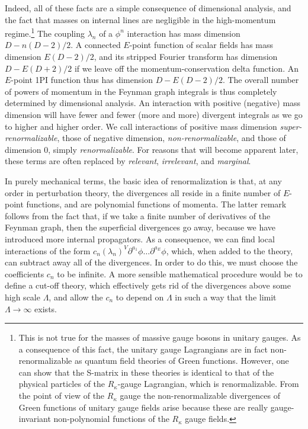 Indeed, all of these facts are a simple consequence of dimensional analysis,
and the fact that masses on internal lines are negligible in the high-momentum
regime.\footnote[1]{This is not true for the masses of massive gauge bosons in
unitary gauges. As a consequence of this fact, the unitary gauge Lagrangians
are in fact non-renormalizable as quantum field theories of Green functions.
However, one can show that the S-matrix in these theories is identical to that
of the physical particles of the $R_\kappa$-gauge Lagrangian, which is
renormalizable. From the point of view of the $R_\kappa$ gauge the
non-renormalizable divergences of Green functions of unitary gauge fields
arise because these are really gauge-invariant non-polynomial functions of the
$R_\kappa$ gauge fields.}
The coupling $\lambda_n$ of a $\phi^n$ interaction has mass dimension
$D-n(D-2)/2$. A connected $E$-point function of scalar fields has mass
dimension $E(D-2)/2$, and its stripped Fourier transform has dimension
$D-E(D+2)/2$ if we leave off the momentum-conservation delta function. An
$E$-point 1PI function thus has dimension $D-E(D-2)/2$. The overall number of powers of momentum in the Feynman
graph integrals is thus completely determined by dimensional analysis. An
interaction with positive (negative) mass dimension will have fewer and fewer
(more and more) divergent integrals as we go to higher and higher order. We
call interactions of positive mass dimension \emph{super-renormalizable},
those of negative dimension, \emph{non-renormalizable}, and those of dimension
0, simply \emph{renormalizable}. For reasons that will become apparent later,
these terms are often replaced by \emph{relevant}, \emph{irrelevant}, and
\emph{marginal}.

In purely mechanical terms, the basic idea of renormalization is that, at any
order in perturbation theory, the divergences all reside in a finite number of
$E$-point functions, and are polynomial functions of momenta. The latter
remark follows from the fact that, if we take a finite number of derivatives of
the Feynman graph, then the superficial divergences go away, because we have
introduced more internal propagators. As a consequence, we can find local
interactions of the form
$c_n(\lambda_n)^V\partial^{a_1}\phi\ldots\partial^{a_E}\phi$, which,
when added to the theory, can subtract away all of the divergences. In order
to do this, we must choose the coefficients $c_n$ to be infinite. A more
sensible mathematical procedure would be to define a cut-off theory, which
effectively gets rid of the divergences above some high scale $\Lambda$, and
allow the $c_n$ to depend on $\Lambda$ in such a way that the limit
$\Lambda\to\infty$ exists.

